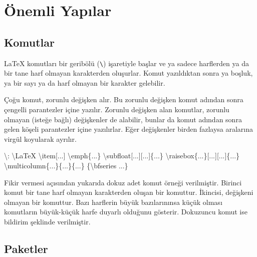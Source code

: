 \documentclass[
  letterpaper,
  DIV=11,
  numbers=noendperiod]{scrreprt}
\newenvironment{Shaded}{\begin{snugshade}}{\end{snugshade}}
\newcommand{\FunctionTok}[1]{\textcolor[rgb]{0.28,0.35,0.67}{#1}}
\newcommand{\NormalTok}[1]{\textcolor[rgb]{0.00,0.23,0.31}{#1}}
\begin{document}
\hypertarget{uxf6nemli-yapux131lar}{%
\section{Önemli Yapılar}\label{uxf6nemli-yapux131lar}}

\hypertarget{komutlar}{%
\subsection{Komutlar}\label{komutlar}}

{\LaTeX} komutları bir geribölü (\texttt{\textbackslash{}}) işaretiyle
başlar ve ya sadece harflerden ya da bir tane harf olmayan karakterden
oluşurlar. Komut yazıldıktan sonra ya boşluk, ya bir sayı ya da harf
olmayan bir karakter gelebilir.

Çoğu komut, zorunlu değişken alır. Bu zorunlu değişken komut adından
sonra çengelli parantezler içine yazılır. Zorunlu değişken alan
komutlar, zorunlu olmayan (isteğe bağlı) değişkenler de alabilir, bunlar
da komut adından sonra gelen köşeli parantezler içine yazılırlar. Eğer
değişkenler birden fazlaysa aralarına virgül koyularak ayrılır.

\begin{Shaded}
\begin{Highlighting}[]
\FunctionTok{\textbackslash{}:}
\FunctionTok{\textbackslash{}LaTeX}
\FunctionTok{\textbackslash{}item}\NormalTok{[...]}
\FunctionTok{\textbackslash{}emph}\NormalTok{\{...\}}
\FunctionTok{\textbackslash{}subfloat}\NormalTok{[...][...]\{...\}}
\FunctionTok{\textbackslash{}raisebox}\NormalTok{\{...\}[...][...]\{...\}}
\FunctionTok{\textbackslash{}multicolumn}\NormalTok{\{...\}\{...\}\{...\}}
\NormalTok{\{}\FunctionTok{\textbackslash{}bfseries}\NormalTok{ ...\}}
\end{Highlighting}
\end{Shaded}

Fikir vermesi açısından yukarıda dokuz adet komut örneği verilmiştir.
Birinci komut bir tane harf olmayan karakterden oluşan bir komuttur.
İkincisi, değişkeni olmayan bir komuttur. Bazı harflerin büyük
bazılarınınsa küçük olması komutların büyük-küçük harfe duyarlı olduğunu
gösterir. Dokuzuncu komut ise bildirim şeklinde verilmiştir.

\hypertarget{paketler}{%
\subsection{Paketler}\label{paketler}}
\end{document}
